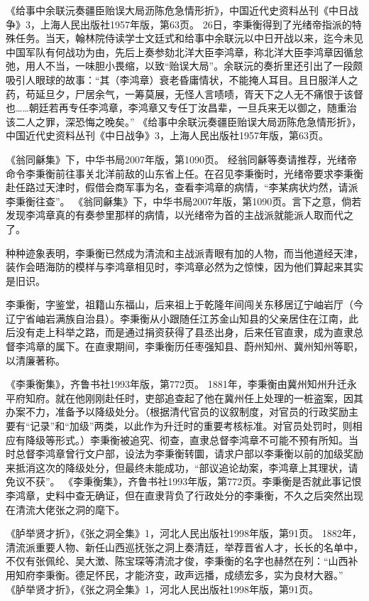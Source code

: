 \documentclass[12pt,UTF8]{ctexbook}
\begin{document}
《给事中余联沅奏疆臣贻误大局沥陈危急情形折》，中国近代史资料丛刊《中日战争》3，上海人民出版社1957年版，第63页。
26日，李秉衡得到了光绪帝指派的特殊任务。当天，翰林院侍读学士文廷式和给事中余联沅以中日开战以来，迄今未见中国军队有何战功为由，先后上奏参劾北洋大臣李鸿章，称北洋大臣李鸿章因循怠弛，用人不当，一味胆小畏缩，以致“贻误大局”。余联沅的奏折里还引出了一段颇吸引人眼球的故事：“其（李鸿章）衰老昏庸情状，不能掩人耳目。且日服洋人之药，苟延旦夕，尸居余气，一筹莫展，无怪人言啧啧，胥天下之人无不痛恨于该督也……朝廷若再专任李鸿章，李鸿章又专任丁汝昌辈，一旦兵来无以御之，随重治该二人之罪，深恐悔之晚矣。” 《给事中余联沅奏疆臣贻误大局沥陈危急情形折》，中国近代史资料丛刊《中日战争》3，上海人民出版社1957年版，第63页。

《翁同龢集》下，中华书局2007年版，第1090页。
经翁同龢等奏请推荐，光绪帝命令李秉衡前往事关北洋前敌的山东省上任。在召见李秉衡时，光绪帝要求李秉衡赴任路过天津时，假借会商军事为名，查看李鸿章的病情，“李某病状灼然，请派李秉衡往查”。 《翁同龢集》下，中华书局2007年版，第1090页。言下之意，倘若发现李鸿章真的有奏参里那样的病情，以光绪帝为首的主战派就能派人取而代之了。

种种迹象表明，李秉衡已然成为清流和主战派青眼有加的人物，而当他道经天津，装作会晤海防的模样与李鸿章相见时，李鸿章必然为之惊悚，因为他们算起来其实是旧识。

李秉衡，字鉴堂，祖籍山东福山，后来祖上于乾隆年间闯关东移居辽宁岫岩厅（今辽宁省岫岩满族自治县）。李秉衡从小跟随任江苏金山知县的父亲居住在江南，此后没有走上科举之路，而是通过捐资获得了县丞出身，后来任官直隶，成为直隶总督李鸿章的属下。在直隶期间，李秉衡历任枣强知县、蔚州知州、冀州知州等职，以清廉著称。

《李秉衡集》，齐鲁书社1993年版，第772页。
1881年，李秉衡由冀州知州升迁永平府知府。就在他刚刚赴任时，吏部追查起了他在冀州任上处理的一桩盗案，因其办案不力，准备予以降级处分。（根据清代官员的议叙制度，对官员的行政奖励主要有“记录”和“加级”两类，以此作为升迁时的重要考核标准。对官员处罚时，则相应有降级等形式。）李秉衡被追究、彻查，直隶总督李鸿章不可能不预有所知。当时总督李鸿章曾行文户部，设法为李秉衡转圜，请求户部以李秉衡以前的加级奖励来抵消这次的降级处分，但最终未能成功，“部议追论劫案，李鸿章上其理状，请免议不获”。 《李秉衡集》，齐鲁书社1993年版，第772页。李秉衡是否就此事记恨李鸿章，史料中查无确证，但在直隶背负了行政处分的李秉衡，不久之后突然出现在清流大佬张之洞的麾下。

《胪举贤才折》，《张之洞全集》1，河北人民出版社1998年版，第91页。
1882年，清流派重要人物、新任山西巡抚张之洞上奏清廷，举荐晋省人才，长长的名单中，不仅有张佩纶、吴大澂、陈宝琛等清流才俊，李秉衡的名字也赫然在列：“山西补用知府李秉衡。德足怀民，才能济变，政声远播，成绩宏多，实为良材大器。” 《胪举贤才折》，《张之洞全集》1，河北人民出版社1998年版，第91页。
\end{document}
